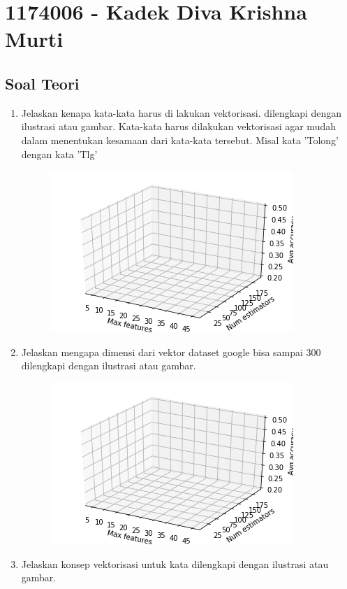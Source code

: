 \section{1174006 - Kadek Diva Krishna Murti}

\subsection{Soal Teori}
\begin{enumerate}
	\item Jelaskan kenapa kata-kata harus di lakukan vektorisasi. dilengkapi dengan ilustrasi atau gambar.
	\hfill\break
	Kata-kata harus dilakukan vektorisasi agar mudah dalam menentukan kesamaan dari kata-kata tersebut. Misal kata 'Tolong' dengan kata 'Tlg'
	\hfill\break
	\begin{figure}[H]
	\centering
		\includegraphics[width=8 cm]{figures/1174006/chapter5/soalteori/v.PNG}
	\end{figure}
	\item Jelaskan mengapa dimensi dari vektor dataset google bisa sampai 300 dilengkapi dengan ilustrasi atau gambar.
	\hfill\break
	
	\hfill\break
	\begin{figure}[H]
	\centering
		\includegraphics[width=8 cm]{figures/1174006/chapter5/soalteori/v.PNG}
	\end{figure}
	\item Jelaskan konsep vektorisasi untuk kata dilengkapi dengan ilustrasi atau gambar.
	\hfill\break
	

\end{enumerate}
